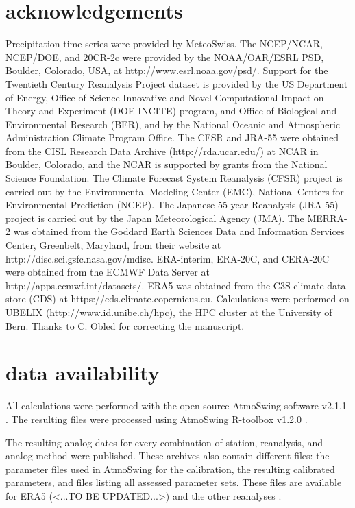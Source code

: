 \documentclass[alpha-refs]{wiley-article}
\begin{document}
\section*{acknowledgements}
Precipitation time series were provided by MeteoSwiss. The NCEP/NCAR, NCEP/DOE, and 20CR-2c were provided by the NOAA/OAR/ESRL PSD, Boulder, Colorado, USA, at http://www.esrl.noaa.gov/psd/. Support for the Twentieth Century Reanalysis Project dataset is provided by the US Department of Energy, Office of Science Innovative and Novel Computational Impact on Theory and Experiment (DOE INCITE) program, and Office of Biological and Environmental Research (BER), and by the National Oceanic and Atmospheric Administration Climate Program Office. The CFSR and JRA-55 were obtained from the CISL Research Data Archive (http://rda.ucar.edu/) at NCAR in Boulder, Colorado, and the NCAR is supported by grants from the National Science Foundation. The Climate Forecast System Reanalysis (CFSR) project is carried out by the Environmental Modeling Center (EMC), National Centers for Environmental Prediction (NCEP). The Japanese 55-year Reanalysis (JRA-55) project is carried out by the Japan Meteorological Agency (JMA). The MERRA-2 was obtained from the Goddard Earth Sciences Data and Information Services Center, Greenbelt, Maryland, from their website at http://disc.sci.gsfc.nasa.gov/mdisc. ERA-interim, ERA-20C, and CERA-20C were obtained from the ECMWF Data Server at http://apps.ecmwf.int/datasets/. ERA5 was obtained from the C3S climate data store (CDS) at https://cds.climate.copernicus.eu. Calculations were performed on UBELIX (http://www.id.unibe.ch/hpc), the HPC cluster at the University of Bern. Thanks to C. Obled for correcting the manuscript.


\section*{data availability}
All calculations were performed with the open-source AtmoSwing software v2.1.1 \citep{Horton2019c}. The resulting files were processed using AtmoSwing R-toolbox v1.2.0 \citep{Horton2018d}.

The resulting analog dates for every combination of station, reanalysis, and analog method were published. These archives also contain different files: the parameter files used in AtmoSwing for the calibration, the resulting calibrated parameters, and files listing all assessed parameter sets. These files are available for ERA5 (<...TO BE UPDATED...>) and the other reanalyses \citep[see references in][]{Horton2018b}.
\end{document}
